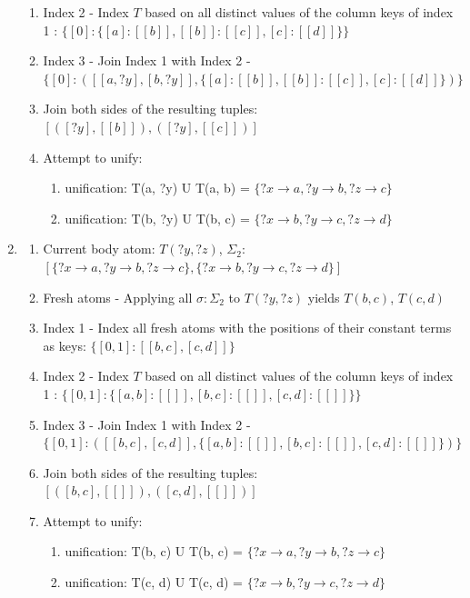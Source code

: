 \documentclass[sigconf,screen,review,natbib]{acmart}
\theoremstyle{definition}
\begin{document}
\begin{enumerate}
\begin{enumerate}
		      \item Index 2 - Index $T$ based on all distinct values of the column keys of index 1 : $\{[0]: \{[a]: [[b]], [[b]]: [[c]], [c]: [[d]]\}\}$
		      \item Index 3 - Join Index 1 with Index 2 - $\{[0] : ([[a, ?y], [b, ?y]], \{[a]: [[b]], [[b]]: [[c]], [c]: [[d]]\})\}$
		      \item Join both sides of the resulting tuples: $[([?y], [[b]]), ([?y], [[c]])]$
		      \item Attempt to unify:
		            \begin{enumerate}
			            \item unification: T(a, ?y) U T(a, b) = $\{?x \rightarrow a, ?y \rightarrow b, ?z \rightarrow c\}$
			            \item unification: T(b, ?y) U T(b, c) = $\{?x \rightarrow b, ?y \rightarrow c, ?z \rightarrow d\}$
		            \end{enumerate}
	      \end{enumerate}
	\item \begin{enumerate}
		      \item Current body atom: $T(?y, ?z)$, $\Sigma_2$: $[\{?x \rightarrow a, ?y \rightarrow b, ?z \rightarrow c\}, \{?x \rightarrow b, ?y \rightarrow c, ?z \rightarrow d\}]$
		      \item Fresh atoms - Applying all $\sigma : \Sigma_2$ to $T(?y, ?z)$ yields $T(b, c)$, $T(c, d)$
		      \item Index 1 - Index all fresh atoms with the positions of their constant terms as keys: $\{[0, 1] : [[b, c], [c, d]]\}$
		      \item Index 2 - Index $T$ based on all distinct values of the column keys of index 1 : $\{[0, 1]: \{[a, b]: [[]], [b, c]: [[]], [c, d]: [[]]\}\}$
		      \item Index 3 - Join Index 1 with Index 2 - $\{[0, 1] : ([[b, c], [c, d]], \{[a, b]: [[]], [b, c]: [[]], [c, d]: [[]]\})\}$
		      \item Join both sides of the resulting tuples: $[([b, c], [[]]), ([c, d], [[]])]$
		      \item Attempt to unify:
		            \begin{enumerate}
			            \item unification: T(b, c) U T(b, c) = $\{?x \rightarrow a, ?y \rightarrow b, ?z \rightarrow c\}$
			            \item unification: T(c, d) U T(c, d) = $\{?x \rightarrow b, ?y \rightarrow c, ?z \rightarrow d\}$
		            \end{enumerate}
	      \end{enumerate}
\end{enumerate}
\end{document}
